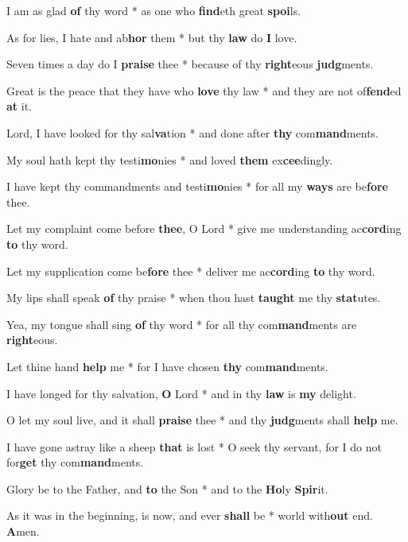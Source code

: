 \begin{multicols}{2}
	I am as glad \textbf{of} thy word * as one who \textbf{find}eth great \textbf{spoi}ls.
	
	As for lies, I hate and ab\textbf{hor} them * but thy \textbf{law} do \textbf{I} love.
	
	Seven times a day do I \textbf{praise} thee * because of thy \textbf{right}eous \textbf{judg}ments.
	
	Great is the peace that they have who \textbf{love} thy law * and they are not of\textbf{fend}ed \textbf{at} it.
	
	Lord, I have looked for thy sal\textbf{va}tion * and done after \textbf{thy} com\textbf{mand}ments.
	
	My soul hath kept thy testi\textbf{mo}nies * and loved \textbf{them} ex\textbf{cee}dingly.
	
	I have kept thy commandments and testi\textbf{mo}nies * for all my \textbf{ways} are be\textbf{fore} thee.
	
	Let my complaint come before \textbf{thee}, O Lord * give me understanding ac\textbf{cord}ing \textbf{to} thy word.
	
	Let my supplication come be\textbf{fore} thee * deliver me ac\textbf{cord}ing \textbf{to} thy word.
	
	My lips shall speak \textbf{of} thy praise * when thou hast \textbf{taught} me thy \textbf{stat}utes.
	
	Yea, my tongue shall sing \textbf{of} thy word * for all thy com\textbf{mand}ments are \textbf{right}eous.
	
	Let thine hand \textbf{help} me * for I have chosen \textbf{thy} com\textbf{mand}ments.
	
	I have longed for thy salvation, \textbf{O} Lord * and in thy \textbf{law} is \textbf{my} delight.
	
	O let my soul live, and it shall \textbf{praise} thee * and thy \textbf{judg}ments shall \textbf{help} me.
	
	I have gone astray like a sheep \textbf{that} is lost * O seek thy servant, for I do not for\textbf{get} thy com\textbf{mand}ments.
	
	Glory be to the Father, and \textbf{to} the Son * and to the \textbf{Ho}ly \textbf{Spir}it.
	
	As it was in the beginning, is now, and ever \textbf{shall} be * world with\textbf{out} end. \textbf{A}men.
\end{multicols}